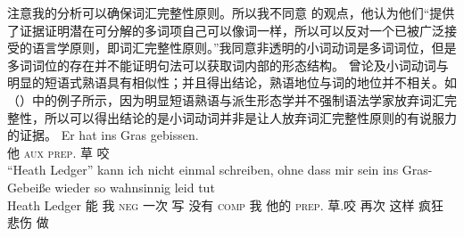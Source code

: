 \begin{exe}
\begin{xlist}[iv.]
\begin{exe}
\begin{xlist}[iv.]
注意我的分析可以确保词汇完整性原则。所以我不同意 \citet*[]{CSP2010a}的观点，他认为他们“提供了证据证明潜在可分解的多词项自己可以像词一样，所以可以反对一个已被广泛接受的语言学原则，即词汇完整性原则。”我同意非透明的小词动词是多词词位，但是多词词位的存在并不能证明句法可以获取词内部的形态结构。 曾论及小词动词与明显的短语式熟语具有相似性；并且得出结论，熟语地位与词的地位并不相关。如（）中的例子所示，因为明显短语熟语与派生形态学并不强制语法学家放弃词汇完整性，所以可以得出结论的是小词动词并非是让人放弃词汇完整性原则的有说服力的证据。
\eal
\ex
\gll Er hat ins Gras gebissen.\\
     他 \textsc{aux} \textsc{prep}. 草 咬\\
\ex 
\gll "`Heath Ledger"' kann ich nicht einmal schreiben, ohne dass mir sein ins Gras-Gebeiße wieder so
wahnsinnig leid tut%
\footnotemark\\
    \spacebr{}Heath Ledger 能 我 \textsc{neg} 一次 写 没有 \textsc{comp} 我 他的 \textsc{prep}. 草.咬 再次 这样
    疯狂 悲伤 做\\
\footnotetext{%
}
\end{xlist}
\end{exe}
\end{xlist}
\end{exe}
